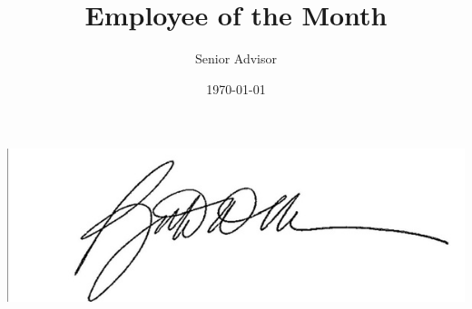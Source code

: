 \documentclass[12pt]{article}
\title{Employee of the Month}
\author{Senior Advisor}
\date{\today}
\begin{document}
\maketitle
\includegraphics{sig.jpg}
\end{document}
